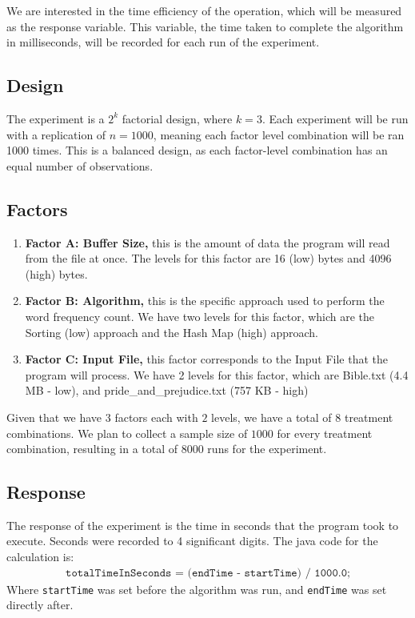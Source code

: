 \documentclass{article}
\begin{document}
  We are interested in the time efficiency of the operation, which will be measured as the
  response variable. This variable, the time taken to complete the algorithm
  in milliseconds, will be recorded for each run of the experiment.

\subsection{Design}
  The experiment is a $2^k$ factorial design, where $k=3$.
  Each experiment will be run with a replication of $n=1000$,
  meaning each factor level combination will be ran 1000 times.
  This is a balanced design, as each factor-level
  combination has an equal number of observations.

\subsection{Factors}
  \begin{enumerate}
    \item \textbf{Factor A: Buffer Size,} this is the amount of data the program will read from the file at once. The levels for this factor are 16 (low) bytes and 4096 (high) bytes.
    \item \textbf{Factor B: Algorithm,} this is the specific approach used to perform the word frequency count. We have two levels for this factor, which are the Sorting (low) approach and the Hash Map (high) approach.
    \item \textbf{Factor C: Input File,} this factor corresponds to the Input File that the program will process. We have 2 levels for this factor, which are Bible.txt (4.4 MB - low), and pride\_and\_prejudice.txt (757 KB - high)
  \end{enumerate}

  Given that we have $3$ factors each with $2$ levels,
  we have a total of $8$ treatment combinations.
  We plan to collect a sample size of $1000$ for every treatment combination,
  resulting in a total of $8000$ runs for the experiment.

\subsection{Response}
  The response of the experiment is the time in seconds that the program took to execute.
  Seconds were recorded to 4 significant digits. The java code for the calculation is:
  \begin{align*}
    \texttt{totalTimeInSeconds = (endTime - startTime) / 1000.0;}
  \end{align*}
  Where \texttt{startTime} was set before the algorithm was run, and \texttt{endTime} was set directly after.
\end{document}

